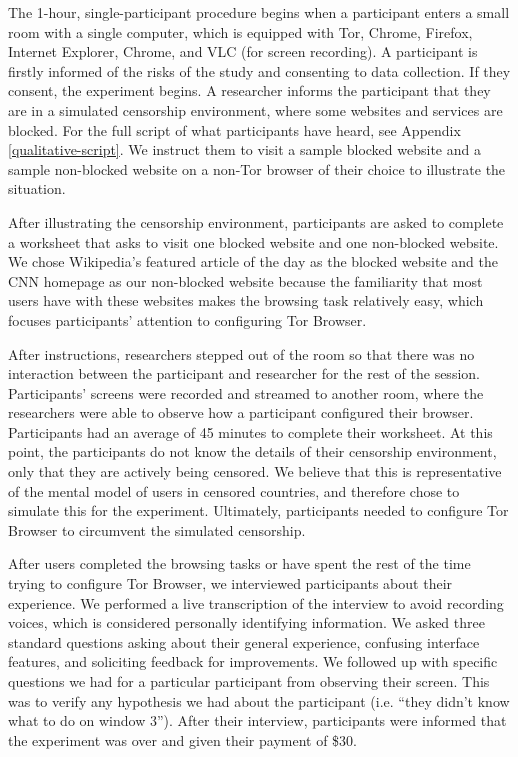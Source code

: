 \documentclass{template}
\begin{document}
The 1-hour, single-participant procedure begins when a participant enters a small 
room with a single computer, which is equipped with Tor, Chrome, Firefox, Internet Explorer, 
Chrome, and VLC (for screen recording). A participant is firstly informed of 
the risks of the study and consenting to data collection. If they consent, the 
experiment begins. A researcher informs the participant that they are in a
simulated censorship environment, where some websites and services are blocked. 
For the full script of what participants have heard, see Appendix \ref{qualitative-script}. We
instruct them to visit a sample blocked website and a sample non-blocked website on a
non-Tor browser of their choice to illustrate the situation.

After illustrating the censorship environment, participants are asked to 
complete a worksheet that asks to visit one blocked website and one non-blocked website. 
We chose Wikipedia's featured article of the day as the blocked website and 
the CNN homepage as our non-blocked website because the familiarity 
that most users have with these websites makes the browsing task relatively easy, 
which focuses participants' attention to configuring Tor Browser. 

After instructions, researchers stepped out of the room so that there was no interaction
between the participant and researcher for the rest of the session. Participants' screens 
were recorded and streamed to another room, where the researchers were able to 
observe how a participant configured their browser. Participants had an 
average of 45 minutes to complete their worksheet. 
At this point, the participants do not know the details of their censorship environment,
only that they are actively being censored. We believe that this is representative 
of the mental model of users in censored countries, and therefore chose to simulate 
this for the experiment. Ultimately, participants needed to configure Tor Browser to 
circumvent the simulated censorship. 

After users completed the browsing tasks or have spent the rest of the time
trying to configure Tor Browser, we interviewed participants about their experience.
We performed a live transcription of the interview to avoid recording voices, which is
considered personally identifying information. 
We asked three standard questions asking about their general experience, 
confusing interface features, and soliciting feedback for improvements. We followed up
with specific questions we had for a particular participant from observing their screen. 
This was to verify any hypothesis we had about the participant (i.e. ``they didn't know what to do on window 3'').  
After their interview, participants were informed that the experiment was over and 
given their payment of \$30. 
\end{document}
